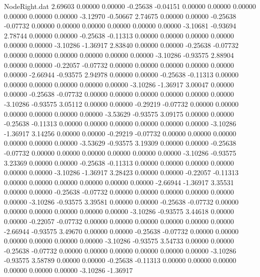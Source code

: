 \begin{filecontents}{NodeRight.dat}
   2.69603    0.00000    0.00000    -0.25638   -0.04151    0.00000    0.00000    0.00000    0.00000    0.00000    0.00000   -3.12970   -0.50667
   2.74675    0.00000    0.00000    -0.25638   -0.07732    0.00000    0.00000    0.00000    0.00000    0.00000    0.00000   -3.10681   -0.93694
   2.78744    0.00000    0.00000    -0.25638   -0.11313    0.00000    0.00000    0.00000    0.00000    0.00000    0.00000   -3.10286   -1.36917
   2.83840    0.00000    0.00000    -0.25638   -0.07732    0.00000    0.00000    0.00000    0.00000    0.00000    0.00000   -3.10286   -0.93575
   2.88904    0.00000    0.00000    -0.22057   -0.07732    0.00000    0.00000    0.00000    0.00000    0.00000    0.00000   -2.66944   -0.93575
   2.94978    0.00000    0.00000    -0.25638   -0.11313    0.00000    0.00000    0.00000    0.00000    0.00000    0.00000   -3.10286   -1.36917
   3.00047    0.00000    0.00000    -0.25638   -0.07732    0.00000    0.00000    0.00000    0.00000    0.00000    0.00000   -3.10286   -0.93575
   3.05112    0.00000    0.00000    -0.29219   -0.07732    0.00000    0.00000    0.00000    0.00000    0.00000    0.00000   -3.53629   -0.93575
   3.09175    0.00000    0.00000    -0.25638   -0.11313    0.00000    0.00000    0.00000    0.00000    0.00000    0.00000   -3.10286   -1.36917
   3.14256    0.00000    0.00000    -0.29219   -0.07732    0.00000    0.00000    0.00000    0.00000    0.00000    0.00000   -3.53629   -0.93575
   3.19309    0.00000    0.00000    -0.25638   -0.07732    0.00000    0.00000    0.00000    0.00000    0.00000    0.00000   -3.10286   -0.93575
   3.23369    0.00000    0.00000    -0.25638   -0.11313    0.00000    0.00000    0.00000    0.00000    0.00000    0.00000   -3.10286   -1.36917
   3.28423    0.00000    0.00000    -0.22057   -0.11313    0.00000    0.00000    0.00000    0.00000    0.00000    0.00000   -2.66944   -1.36917
   3.35531    0.00000    0.00000    -0.25638   -0.07732    0.00000    0.00000    0.00000    0.00000    0.00000    0.00000   -3.10286   -0.93575
   3.39581    0.00000    0.00000    -0.25638   -0.07732    0.00000    0.00000    0.00000    0.00000    0.00000    0.00000   -3.10286   -0.93575
   3.44618    0.00000    0.00000    -0.22057   -0.07732    0.00000    0.00000    0.00000    0.00000    0.00000    0.00000   -2.66944   -0.93575
   3.49670    0.00000    0.00000    -0.25638   -0.07732    0.00000    0.00000    0.00000    0.00000    0.00000    0.00000   -3.10286   -0.93575
   3.54733    0.00000    0.00000    -0.25638   -0.07732    0.00000    0.00000    0.00000    0.00000    0.00000    0.00000   -3.10286   -0.93575
   3.58789    0.00000    0.00000    -0.25638   -0.11313    0.00000    0.00000    0.00000    0.00000    0.00000    0.00000   -3.10286   -1.36917

\end{filecontents}
